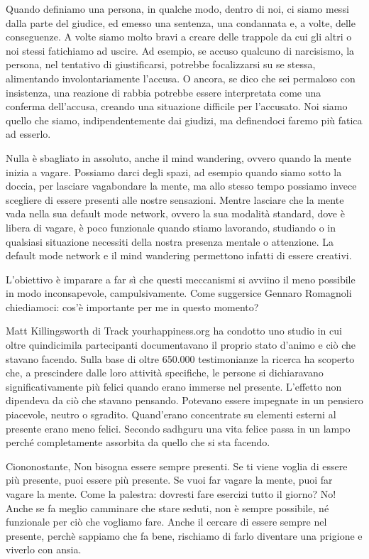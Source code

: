 \documentclass[12pt]{book} %
\begin{document}
Quando definiamo una persona, in qualche modo, dentro di noi, ci siamo messi dalla parte del giudice, ed emesso
una sentenza, una condannata e, a volte, delle conseguenze. 
A volte siamo molto bravi a creare delle trappole da cui gli altri o noi stessi fatichiamo ad uscire.
Ad esempio, se accuso qualcuno di narcisismo, la persona, nel tentativo di giustificarsi, potrebbe focalizzarsi su se stessa, alimentando involontariamente l'accusa. O ancora, se dico che sei permaloso con insistenza, una reazione di rabbia potrebbe essere interpretata come una conferma dell'accusa, creando una situazione difficile per l'accusato.
Noi siamo quello che siamo,
indipendentemente dai giudizi, ma definendoci faremo più fatica ad esserlo.

Nulla è sbagliato in assoluto, anche il mind wandering, ovvero quando la mente inizia a vagare. Possiamo darci degli spazi, ad
esempio quando siamo sotto la doccia, per lasciare vagabondare la mente, ma allo stesso tempo possiamo invece scegliere
di essere presenti alle nostre sensazioni. Mentre lasciare che la mente vada
nella sua default mode network, ovvero la sua modalità standard, dove è libera di vagare, è poco funzionale quando
stiamo lavorando, studiando o in qualsiasi situazione necessiti della nostra presenza mentale o attenzione. 
La default mode network e il mind wandering permettono infatti di essere creativi.

L'obiettivo è imparare a far sì che questi meccanismi si avviino il meno possibile in modo inconsapevole, campulsivamente.
Come suggersice Gennaro Romagnoli chiediamoci: cos'è importante per me in questo momento?

Matt Killingsworth di Track yourhappiness.org ha condotto uno studio in cui oltre quindicimila partecipanti
documentavano il proprio stato d'animo e ciò che stavano facendo. Sulla base di oltre 650.000
testimonianze la ricerca ha scoperto che, a prescindere dalle loro attività specifiche, le persone si dichiaravano
significativamente più felici quando erano immerse nel presente. L'effetto non dipendeva da ciò che stavano pensando. Potevano essere impegnate in un pensiero piacevole, neutro o sgradito.
Quand'erano concentrate su elementi esterni al presente erano meno felici.
Secondo sadhguru una vita felice passa in un lampo perché completamente assorbita da quello che si sta facendo.

Ciononostante, Non bisogna essere sempre presenti. Se ti viene voglia di essere più presente, puoi essere più presente. Se vuoi far vagare la mente, puoi far vagare la mente. Come la palestra: dovresti fare esercizi tutto il giorno? No! Anche se fa meglio camminare che stare seduti, non è sempre
possibile, né funzionale per ciò che vogliamo fare. Anche il cercare di essere sempre nel presente, perchè sappiamo che fa bene, rischiamo di farlo diventare una prigione e viverlo con ansia.
\end{document}
